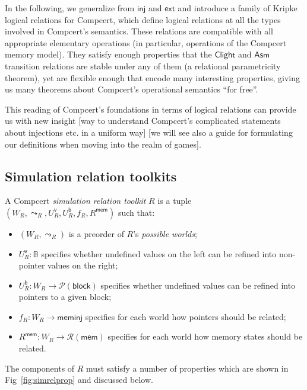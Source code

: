 \documentclass[acmsmall,anonymous,review]{acmart}
\newcommand{\kw}[1]{\ensuremath{ \textsf{#1} }}
\begin{document}
In the following,
we generalize from \kw{inj} and \kw{ext} and
introduce a family of Kripke logical relations for Compcert,
which define logical relations at all the types
involved in Compcert's semantics.
These relations are compatible with
all appropriate elementary operations
(in particular, operations of the Compcert memory model).
They satisfy enough properties that
the \kw{Clight} and \kw{Asm} transition relations
are stable under any of them
(a relational parametricity theorem),
yet are flexible enough that encode many interesting properties,
giving us many theorems about Compcert's operational semantics
``for free''.

This reading of Compcert's foundations
in terms of logical relations
can provide us with new insight
[way to understand Compcert's complicated
statements about injections etc. in a uniform way]
[we will see also a guide for formulating our definitions
when moving into the realm of games].


\subsection{Simulation relation toolkits} %

\begin{definition}[\kw{simrel}]
A Compcert \emph{simulation relation toolkit} $R$
is a tuple $(W_R, \leadsto_R, U^\kw{v}_R, U^\kw{b}_R, f_R, R^\kw{mem})$
such that:
\begin{itemize}
\item $(W_R, \leadsto_R)$
  is a preorder of $R$'s \emph{possible worlds};
\item $U^\kw{v}_R : \mathbb{B}$
  specifies whether undefined values on the left
  can be refined into non-pointer values on the right;
\item $U^\kw{b}_R : W_R \rightarrow \mathcal{P}(\kw{block})$
  specifies whether undefined values can be refined into pointers to a given block;
\item $f_R : W_R \rightarrow \kw{meminj}$
  specifies for each world how pointers should be related;
\item $R^\kw{mem} : W_R \rightarrow \mathcal{R}(\kw{mem})$
  specifies for each world how memory states should be related.
\end{itemize}
The components of $R$ must satisfy
a number of properties which are shown in Fig~\ref{fig:simrelprop}
and discussed below.
\end{definition}
\end{document}
